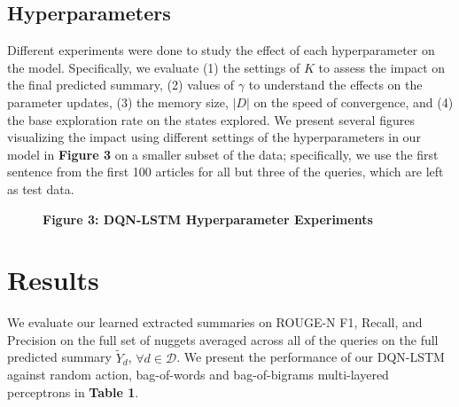 \documentclass[12pt]{article}
\begin{document}
\subsection{Hyperparameters}
Different experiments were done to study the effect of each hyperparameter on the model.  Specifically, we evaluate (1) the settings of $K$ to assess the impact on the final predicted summary, (2) values of $\gamma$ to understand the effects on the parameter updates, (3) the memory size, $ | D |$ on the speed of convergence, and (4) the base exploration rate on the states explored. We present several figures visualizing the impact using different settings of the hyperparameters in our model in \textbf{Figure 3} on a smaller subset of the data; specifically, we use the first sentence from the first 100 articles for all but three of the queries, which are left as test data. 

\begin{figure}[h]
    \centering
    \captionsetup{labelformat=empty}
    \caption{\textbf{Figure 3: DQN-LSTM Hyperparameter Experiments}}
\end{figure}

\section{Results}
We evaluate our learned extracted summaries on ROUGE-N F1, Recall, and Precision on the full set of nuggets averaged across all of the queries on the full predicted summary $\tilde{Y}_d$, $\forall d \in \mathcal{D}$. We present the performance of our DQN-LSTM against random action, bag-of-words and bag-of-bigrams multi-layered perceptrons in \textbf{Table 1}. 
\end{document}
